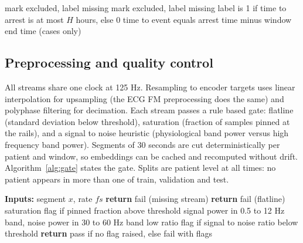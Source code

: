 \documentclass[11pt]{article}
\begin{document}
\begin{algorithm}[t]
\caption{Window labeling and exclusions}
\label{alg:labels}
\begin{algorithmic}[1]
        \State mark excluded, label missing 
        \State mark excluded, label missing 
    \Else
            \State label is 1 if time to arrest is at most $H$ hours, else 0
        \EndFor
        \State time to event equals arrest time minus window end time (cases only)
    \EndIf
\EndFor
\end{algorithmic}
\end{algorithm}

\subsection{Preprocessing and quality control}
All streams share one clock at 125 Hz. Resampling to encoder targets uses linear
interpolation for upsampling (the ECG FM preprocessing does the same) and
polyphase filtering for decimation. Each stream passes a rule based gate: flatline
(standard deviation below threshold), saturation (fraction of samples pinned at the
rails), and a signal to noise heuristic (physiological band power versus high
frequency band power). Segments of 30 seconds are cut deterministically per patient
and window, so embeddings can be cached and recomputed without drift.
Algorithm~\ref{alg:gate} states the gate. Splits are patient level at all times:
no patient appears in more than one of train, validation and test.

\begin{algorithm}[t]
\caption{Per stream quality gate}
\label{alg:gate}
\begin{algorithmic}[1]
\State \textbf{Inputs:} segment $x$, rate $fs$
    \State \textbf{return} fail (missing stream)
\EndIf
{}
    \State \textbf{return} fail (flatline)
\EndIf
\State saturation flag if pinned fraction above threshold
\State signal power in 0.5 to 12 Hz band, noise power in 30 to 60 Hz band
\State low ratio flag if signal to noise ratio below threshold
\State \textbf{return} pass if no flag raised, else fail with flags
\end{algorithmic}
\end{algorithm}
\end{document}

